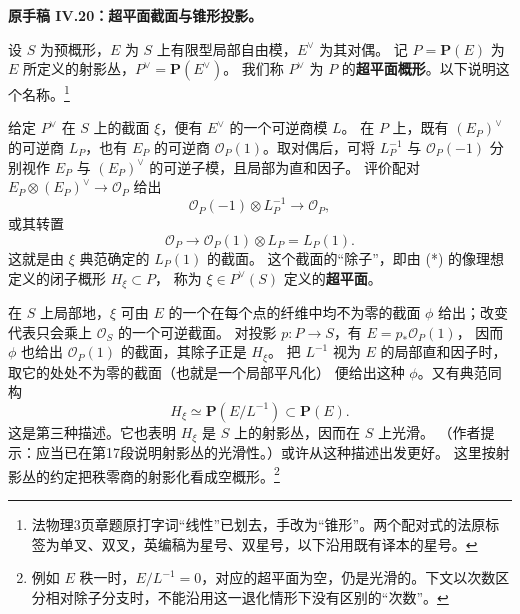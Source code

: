 \begingroup
\def\OO{\mathcal O}\def\FF{\mathcal F}\def\GG{\mathcal G}
\def\PP{\mathbf P}\def\calP{\mathcal P}\def\dd{\delta}
\def\Div{\operatorname{Div}}\def\depth{\operatorname{depth}}
\def\pr{\operatorname{pr}}\def\coker{\operatorname{coker}}
\par\medskip\noindent\textbf{原手稿 IV.20：超平面截面与锥形投影。}

设 \(S\) 为预概形，\(E\) 为 \(S\) 上有限型局部自由模，\(E^\vee\) 为其对偶。
记 \(P=\PP(E)\) 为 \(E\) 所定义的射影丛，\(P^\vee=\PP(E^\vee)\)。
我们称 \(P^\vee\) 为 \(P\) 的\textbf{超平面概形}。以下说明这个名称。\footnote{法物理3页章题原打字词“线性”已划去，手改为“锥形”。两个配对式的法原标签为单叉、双叉，英编稿为星号、双星号，以下沿用既有译本的星号。}

给定 \(P^\vee\) 在 \(S\) 上的截面 \(\xi\)，便有 \(E^\vee\) 的一个可逆商模 \(L\)。
在 \(P\) 上，既有 \((E_P)^\vee\) 的可逆商 \(L_P\)，也有 \(E_P\) 的可逆商
\(\OO_P(1)\)。取对偶后，可将 \(L_P^{-1}\) 与 \(\OO_P(-1)\) 分别视作
\(E_P\) 与 \((E_P)^\vee\) 的可逆子模，且局部为直和因子。
评价配对 \(E_P\otimes(E_P)^\vee\to\OO_P\) 给出
\begin{equation}
 \OO_P(-1)\otimes L_P^{-1}\longrightarrow\OO_P,\tag{*}
\end{equation}
或其转置
\begin{equation}
 \OO_P\longrightarrow\OO_P(1)\otimes L_P=L_P(1).\tag{**}
\end{equation}
这就是由 \(\xi\) 典范确定的 \(L_P(1)\) 的截面。
这个截面的“除子”，即由 (*) 的像理想定义的闭子概形 \(H_\xi\subset P\)，
称为 \(\xi\in P^\vee(S)\) 定义的\textbf{超平面}。

在 \(S\) 上局部地，\(\xi\) 可由 \(E\) 的一个在每个点的纤维中均不为零的截面
\(\phi\) 给出；改变代表只会乘上 \(\OO_S\) 的一个可逆截面。
对投影 \(p:P\to S\)，有 \(E=p_*\OO_P(1)\)，
因而 \(\phi\) 也给出 \(\OO_P(1)\) 的截面，其除子正是 \(H_\xi\)。
把 \(L^{-1}\) 视为 \(E\) 的局部直和因子时，取它的处处不为零的截面（也就是一个局部平凡化）
便给出这种 \(\phi\)。又有典范同构
\[
 H_\xi\simeq \PP(E/L^{-1})\subset \PP(E).
\]
这是第三种描述。它也表明 \(H_\xi\) 是 \(S\) 上的射影丛，因而在 \(S\) 上光滑。
（作者提示：应当已在第17段说明射影丛的光滑性。）或许从这种描述出发更好。
这里按射影丛的约定把秩零商的射影化看成空概形。\footnote{例如 \(E\) 秩一时，\(E/L^{-1}=0\)，对应的超平面为空，仍是光滑的。下文以次数区分相对除子分支时，不能沿用这一退化情形下没有区别的“次数”。}

